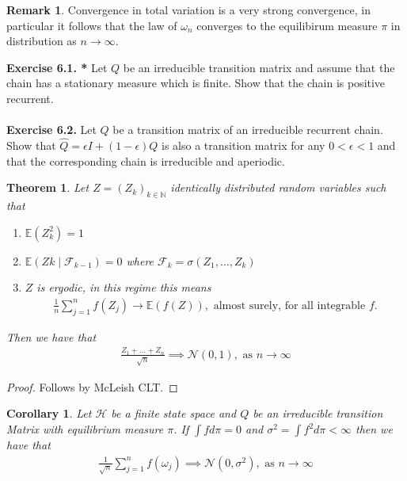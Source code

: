 \documentclass[11pt,a4paper, final]{article}
\newtheorem{thm}{Theorem}[section]
\newtheorem{cor}{Corollary}[section]
\theoremstyle{definition}
\newtheorem{rem}{Remark}[section]
\begin{document}
\begin{rem} Convergence in total variation is a very strong convergence, in particular it follows that the law of $\omega_n$ converges to the equilibirum measure $\pi$ in distribution as $n \to \infty$. 
\end{rem}
\newpage
\noindent \textbf{Exercise 6.1. *} Let $Q$ be an irreducible transition matrix and assume that the chain has a stationary measure which is finite. Show that the chain is positive recurrent. 
\\\\
\textbf{Exercise 6.2.} Let $Q$ be a transition matrix of an irreducible recurrent chain. Show that $\widehat{Q}= \epsilon I + (1- \epsilon) Q$ is also a transition matrix for any $0 < \epsilon < 1$ and that the corresponding chain is irreducible and aperiodic. 
\begin{thm} Let $Z=(Z_k)_{k \in \mathbb{N}}$ identically distributed random variables such that
\begin{enumerate}
\item $\mathbb{E}(Z_k^2)=1$ 
\item $\mathbb{E}(Zk \mid \mathcal{F}_{k-1}) = 0$ where $\mathcal{F}_k = \sigma (Z_1, \dots , Z_k)$
\item $Z$ is ergodic, in this regime this means 
\begin{align*}
\frac{1}{n} \sum_{j=1}^n f(Z_j) \to \mathbb{E}(f(Z)), \text{ almost surely, for all integrable $f$}.
\end{align*}
\end{enumerate}
Then we have that
\begin{align*}
\frac{Z_1 + \dots + Z_n}{\sqrt{n}} \implies \mathcal{N}(0,1), \text{ as } n  \to \infty 
\end{align*}
\end{thm}
\begin{proof}
Follows by McLeish CLT.
\end{proof}
\begin{cor} Let $\mathcal{H}$ be a finite state space and $Q$ be an irreducible transition Matrix with equilibrium measure $\pi$. If $\int f d  \pi =0$ and $\sigma^2 = \int f^2 d \pi <  \infty$ then we have that 
\begin{align*}
\frac{1}{\sqrt{n}} \sum_{j=1}^n f ( \omega_j) \implies \mathcal{N}(0, \sigma^2), \text{ as } n  \to \infty 
\end{align*}
\end{cor}
\newpage
\end{document}
